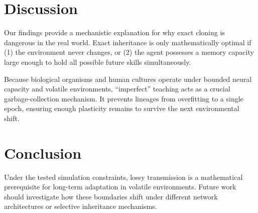 \documentclass[11pt,a4paper]{article}
\begin{document}
\section{Discussion}
Our findings provide a mechanistic explanation for why exact cloning is dangerous in the real world. Exact inheritance is only mathematically optimal if (1) the environment never changes, or (2) the agent possesses a memory capacity large enough to hold all possible future skills simultaneously.

Because biological organisms and human cultures operate under bounded neural capacity and volatile environments, ``imperfect'' teaching acts as a crucial garbage-collection mechanism. It prevents lineages from overfitting to a single epoch, ensuring enough plasticity remains to survive the next environmental shift.

\section{Conclusion}
Under the tested simulation constraints, lossy transmission is a mathematical prerequisite for long-term adaptation in volatile environments. Future work should investigate how these boundaries shift under different network architectures or selective inheritance mechanisms.
\end{document}
